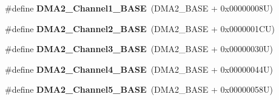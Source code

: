 \begin{DoxyCompactItemize}
\item 
\hypertarget{group___peripheral__memory__map_gad3bd6c4201d12f5d474518c1b02f8e3b}{\#define {\bfseries D\-M\-A2\-\_\-\-Channel1\-\_\-\-B\-A\-S\-E}~(D\-M\-A2\-\_\-\-B\-A\-S\-E + 0x00000008\-U)}\label{group___peripheral__memory__map_gad3bd6c4201d12f5d474518c1b02f8e3b}

\item 
\hypertarget{group___peripheral__memory__map_ga22f39f23c879c699b88e04a629f69d1c}{\#define {\bfseries D\-M\-A2\-\_\-\-Channel2\-\_\-\-B\-A\-S\-E}~(D\-M\-A2\-\_\-\-B\-A\-S\-E + 0x0000001\-C\-U)}\label{group___peripheral__memory__map_ga22f39f23c879c699b88e04a629f69d1c}

\item 
\hypertarget{group___peripheral__memory__map_ga6f2369b8bc155fb55a28891987605c2c}{\#define {\bfseries D\-M\-A2\-\_\-\-Channel3\-\_\-\-B\-A\-S\-E}~(D\-M\-A2\-\_\-\-B\-A\-S\-E + 0x00000030\-U)}\label{group___peripheral__memory__map_ga6f2369b8bc155fb55a28891987605c2c}

\item 
\hypertarget{group___peripheral__memory__map_ga01b063266473f290a55047654fbbfbee}{\#define {\bfseries D\-M\-A2\-\_\-\-Channel4\-\_\-\-B\-A\-S\-E}~(D\-M\-A2\-\_\-\-B\-A\-S\-E + 0x00000044\-U)}\label{group___peripheral__memory__map_ga01b063266473f290a55047654fbbfbee}

\item 
\hypertarget{group___peripheral__memory__map_ga1eea983a5d68bf36f4d19fbb07955ca1}{\#define {\bfseries D\-M\-A2\-\_\-\-Channel5\-\_\-\-B\-A\-S\-E}~(D\-M\-A2\-\_\-\-B\-A\-S\-E + 0x00000058\-U)}\label{group___peripheral__memory__map_ga1eea983a5d68bf36f4d19fbb07955ca1}


\end{DoxyCompactItemize}
